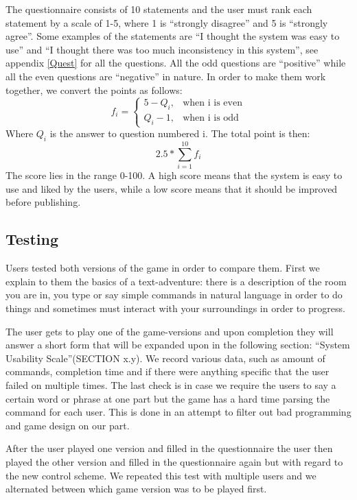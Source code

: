 The questionnaire consists of 10 statements and the user must rank each statement by a scale of 1-5, where 1 is “strongly disagree” and 5 is “strongly agree”. Some examples of the statements are “I thought the system was easy to use” and “I thought there was too much inconsistency in this system”, see appendix \ref{Quest} for all the questions. All the odd questions are ``positive'' while all the even questions are ``negative'' in nature. In order to make them work together, we convert the points as follows: 
\[
    f_{i} = 
\begin{cases}
    5 - Q_{i}, & \text{when i is even}\\
    Q_{i} - 1, & \text{when i is odd}
\end{cases}
\]
Where \(Q_{i} \) is the answer to question numbered i. The total point is then: 
\[ 2.5 * \displaystyle \sum_{i=1}^{10} f_{i} \]
The score lies in the range 0-100. A high score means that the system is easy to use and liked by the users, while a low score means that it should be improved before publishing. \citep{Broo}

\subsection{Testing}
Users tested both versions of the game in order to compare them. First we explain to them the basics of a text-adventure: there is a description of the room you are in, you type or say simple commands in natural language in order to do things and sometimes must interact with your surroundings in order to progress. 

The user gets to play one of the game-versions and upon completion they will answer a short form that will be expanded upon in the following section: “System Usability Scale”(SECTION x.y). We record various data, such as amount of commands, completion time and if there were anything specific that the user failed on multiple times. The last check is in case we require the users to say a certain word or phrase at one part but the game has a hard time parsing the command for each user. This is done in an attempt to filter out bad programming and game design on our part.

After the user played one version and filled in the questionnaire the user then played the other version and filled in the questionnaire again but with regard to the new control scheme. We repeated this test with multiple users and we alternated between which game version was to be played first.